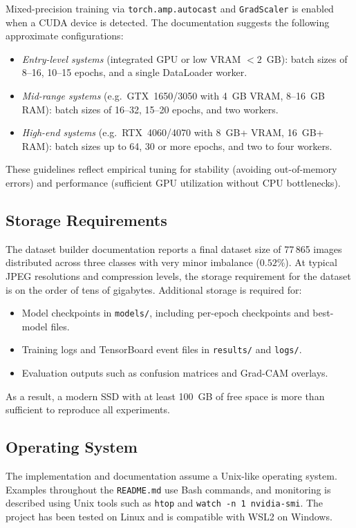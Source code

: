 Mixed-precision training via \texttt{torch.amp.autocast} and \texttt{GradScaler} is enabled when a CUDA device is detected. The documentation suggests the following approximate configurations:
\begin{itemize}
  \item \emph{Entry-level systems} (integrated GPU or low VRAM $<2$~GB): batch sizes of 8--16, 10--15 epochs, and a single DataLoader worker.
  \item \emph{Mid-range systems} (e.g.\ GTX~1650/3050 with 4~GB VRAM, 8--16~GB RAM): batch sizes of 16--32, 15--20 epochs, and two workers.
  \item \emph{High-end systems} (e.g.\ RTX~4060/4070 with 8~GB+ VRAM, 16~GB+ RAM): batch sizes up to 64, 30 or more epochs, and two to four workers.
\end{itemize}

These guidelines reflect empirical tuning for stability (avoiding out-of-memory errors) and performance (sufficient GPU utilization without CPU bottlenecks).

\subsection{Storage Requirements}

The dataset builder documentation reports a final dataset size of 77\,865 images distributed across three classes with very minor imbalance ($0.52\%$). At typical JPEG resolutions and compression levels, the storage requirement for the dataset is on the order of tens of gigabytes. Additional storage is required for:
\begin{itemize}
  \item Model checkpoints in \texttt{models/}, including per-epoch checkpoints and best-model files.
  \item Training logs and TensorBoard event files in \texttt{results/} and \texttt{logs/}.
  \item Evaluation outputs such as confusion matrices and Grad-CAM overlays.
\end{itemize}

As a result, a modern SSD with at least 100~GB of free space is more than sufficient to reproduce all experiments.

\subsection{Operating System}

The implementation and documentation assume a Unix-like operating system. Examples throughout the \texttt{README.md} use Bash commands, and monitoring is described using Unix tools such as \texttt{htop} and \texttt{watch -n 1 nvidia-smi}. The project has been tested on Linux and is compatible with WSL2 on Windows.

